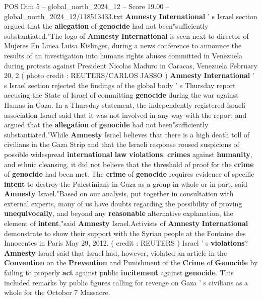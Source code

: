 \begin{textsample}{POS Dim 5 – global\_north\_2024\_12 – Score 19.00 – global\_north\_2024\_12/118513433.txt}  \label{ex:f5_pos_124}
\textbf{Amnesty} \textbf{International} ' s Israel section argued that the \textbf{allegation} of \textbf{genocide} had not been"sufficiently substantiated."The logo of \textbf{Amnesty} \textbf{International} is seen next to director of Mujeres En Linea Luisa Kislinger, during a news conference to announce the results of an investigation into humans rights abuses committed in Venezuela during protests against President Nicolas Maduro in Caracas, Venezuela February 20, 2 ( photo credit : REUTERS/CARLOS JASSO ) \textbf{Amnesty} \textbf{International} ' s Israel section rejected the findings of the global body ' s Thursday report accusing the State of Israel of committing \textbf{genocide} during the war against Hamas in Gaza.
In a Thursday statement, the independently registered Israeli association Israel said that it was not involved in any way with the report and argued that the \textbf{allegation} of \textbf{genocide} had not been"sufficiently substantiated."While \textbf{Amnesty} Israel believes that there is a high death toll of civilians in the Gaza Strip and that the Israeli response roused suspicions of possible widespread \textbf{international} \textbf{law} \textbf{violations}, \textbf{crimes} against \textbf{humanity}, and ethnic cleansing, it did not believe that the threshold of proof for the \textbf{crime} of \textbf{genocide} had been met.
The \textbf{crime} of \textbf{genocide} requires evidence of specific \textbf{intent} to destroy the Palestinians in Gaza as a group in whole or in part, said \textbf{Amnesty} Israel."Based on our analysis, put together in consultation with external experts, many of us have doubts regarding the possibility of proving \textbf{unequivocally}, and beyond any \textbf{reasonable} alternative explanation, the element of \textbf{intent},"said \textbf{Amnesty} Israel.Activists of \textbf{Amnesty} \textbf{International} demonstrate to show their support with the Syrian people at the Fontaine des Innocentes in Paris May 29, 2012. ( credit : REUTERS ) Israel ' s \textbf{violations}? \textbf{Amnesty} Israel said that Israel had, however, violated an article in the \textbf{Convention} on the \textbf{Prevention} and Punishment of the \textbf{Crime} of \textbf{Genocide} by failing to properly \textbf{act} against public \textbf{incitement} against \textbf{genocide}.
This included remarks by public figures calling for revenge on Gaza ' s civilians as a whole for the October 7 Massacre.

\end{textsample}

